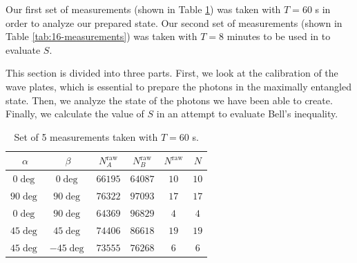 \documentclass{../paper}
\begin{document}
Our first set of measurements (shown in Table \ref{tab:5-measurements}) was taken with $T=60$ s in order to analyze our prepared state. Our second set of measurements (shown in Table \ref{tab:16-measurements}) was taken with $T=8$ minutes to be used in to evaluate $S$.

This section is divided into three parts. First, we look at the calibration of the wave plates, which is essential to prepare the photons in the maximally entangled state. Then, we analyze the state of the photons we have been able to create. Finally, we calculate the value of $S$ in an attempt to evaluate Bell's inequality.

\begin{table}
  \centering
  \begin{tabular}{cc|ccc|c}
    $\alpha$ & $\beta$   & $N_A^\text{raw}$ & $N_B^\text{raw}$ & $N^\text{raw}$ & $N$  \\
    \hline
    $0\deg$  & $0\deg$   & $66195$          & $64087$	         & $10$           & $10$ \\
    $90\deg$ & $90\deg$  & $76322$          & $97093$	         & $17$           & $17$ \\
    $0\deg$  & $90\deg$  & $64369$          & $96829$	         & $4$            & $4$  \\
    $45\deg$ & $45\deg$  & $74406$          & $86618$	         & $19$           & $19$ \\
    $45\deg$ & $-45\deg$ & $73555$          & $76268$	         & $6$            & $6$  \\
  \end{tabular}
  \caption{Set of 5 measurements taken with $T = 60$ s.}
  \label{tab:5-measurements}
\end{table}
\end{document}
